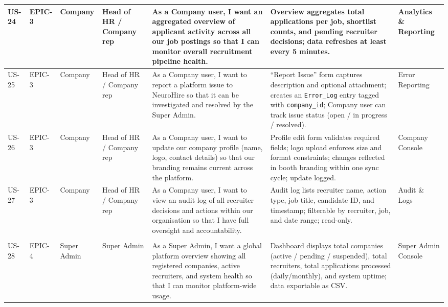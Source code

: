 \begin{longtable}{|p{0.8cm}|p{1.0cm}|p{1.2cm}|p{1.4cm}|p{4.2cm}|p{4.2cm}|p{1.8cm}|}
\rowcolor{nhRow3}
US-24 & EPIC-3 & Company & Head of HR / Company rep &
As a Company user, I want an aggregated overview of applicant activity across all our job postings so that I can monitor overall recruitment pipeline health. &
Overview aggregates total applications per job, shortlist counts, and pending recruiter decisions; data refreshes at least every 5 minutes. &
Analytics \& Reporting \\
\hline

\rowcolor{nhRow3}
US-25 & EPIC-3 & Company & Head of HR / Company rep &
As a Company user, I want to report a platform issue to NeuroHire so that it can be investigated and resolved by the Super Admin. &
``Report Issue'' form captures description and optional attachment; creates an \texttt{Error\_Log} entry tagged with \texttt{company\_id}; Company user can track issue status (open / in progress / resolved). & Error Reporting \\
\hline

\rowcolor{nhRow3}
US-26 & EPIC-3 & Company & Head of HR / Company rep &
As a Company user, I want to update our company profile (name, logo, contact details) so that our branding remains current across the platform. &
Profile edit form validates required fields; logo upload enforces size and format constraints; changes reflected in booth branding within one sync cycle; update logged. & Company Console \\
\hline

\rowcolor{nhRow3}
US-27 & EPIC-3 & Company & Head of HR / Company rep &
As a Company user, I want to view an audit log of all recruiter decisions and actions within our organisation so that I have full oversight and accountability. &
Audit log lists recruiter name, action type, job title, candidate ID, and timestamp; filterable by recruiter, job, and date range; read-only. &
Audit \& Logs \\
\hline

\rowcolor{nhEpic4}
\multicolumn{7}{|l|}{\hspace{4pt}\textcolor{nhEpic4txt}{\textbf{EPIC-4 \quad Super Admin (NeuroHire Platform)}}}\\
\hline

\rowcolor{nhRow4}
US-28 & EPIC-4 & Super Admin & Super Admin &
As a Super Admin, I want a global platform overview showing all registered companies, active recruiters, and system health so that I can monitor platform-wide usage. &
Dashboard displays total companies (active / pending / suspended), total recruiters, total applications processed (daily/monthly), and system uptime; data exportable as CSV. & Super Admin Console \\
\hline


\end{longtable}
